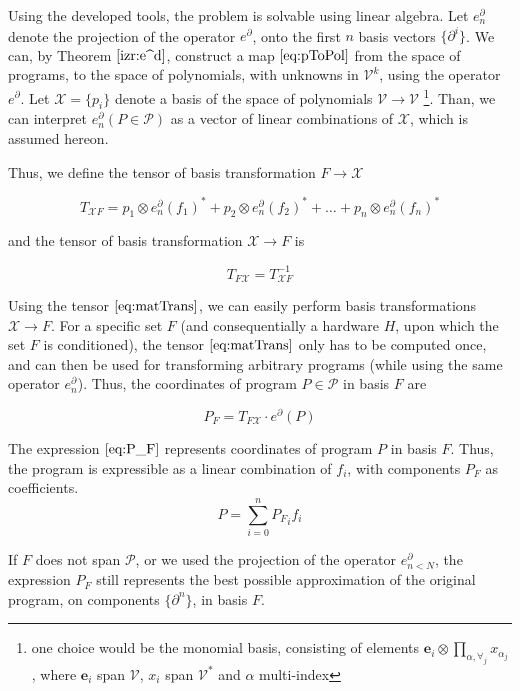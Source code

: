\documentclass[preprint,12pt]{elsarticle}
\newcommand{\VV}{\mathcal{V}}
\newcommand{\e}{\mathbf{e}}
\newcommand{\X}{\mathcal{X}}
\newcommand{\dP}{\mathcal{P}}
\newcommand{\D}{\partial}
\begin{document}
   Using the developed tools, the problem is solvable using linear algebra. Let
   $e^\D_n$ denote the projection of the operator $e^\D$, onto the first $n$
   basis vectors $\{\D^i\}$. We can, by Theorem $\ref{izr:e^d}$, construct a map
   $\eqref{eq:pToPol}$ from the space of programs, to the space of polynomials,
   with unknowns in $\VV^k$, using the operator $e^\D$. Let $\X=\{p_i\}$ denote a basis of
   the space of polynomials $\VV\to \VV$ \footnote{one choice would be the monomial basis,
   consisting of elements $\e_i\otimes\prod\limits_{\alpha,\forall_j}
   x_{\alpha_j}$, where $\e_i$ span $\VV$, $x_i$ span $\VV^*$ and $\alpha$
   multi-index}. Than, we can interpret $e^\D_n(P\in\dP)$ as a vector of linear combinations of $\X$, which is assumed hereon.
  
  Thus, we define the tensor of basis transformation $F\to\X$
  
  \begin{equation}\label{eq:matTransF}
  T_{\X F}=
  p_1\otimes e_n^\D(f_1)^* + p_2\otimes e_n^\D(f_2)^* + \ldots + p_n\otimes e_n^\D(f_n)^*
  \end{equation}
  
  and the tensor of basis transformation $\X\to F$ is
  
  \begin{equation}\label{eq:matTrans}
  T_{F\X}=T_{\X F}^{-1}
  \end{equation}
  
  Using the tensor $\eqref{eq:matTrans}$, we can easily perform basis transformations $\X\to F$. For a specific set $F$ (and consequentially a hardware $H$, upon which the set $F$ is conditioned), the tensor $\eqref{eq:matTrans}$ only has to be computed once, and can then be used for transforming arbitrary programs (while using the same operator $e^\D_n$).
  Thus, the coordinates of program $P\in\dP$ in basis $F$ are
  
  \begin{equation}\label{eq:P_F}
  	P_F=T_{F\X}\cdot e^\D(P)
  \end{equation}
  
  The expression $\eqref{eq:P_F}$ represents coordinates of program $P$ in basis $F$. Thus, the program is expressible as a linear combination of $f_i$, with components $P_F$ as coefficients.
  \begin{equation}
  P=\sum\limits_{i=0}^{n}{P_F}_if_i
  \end{equation}
  
  If $F$ does not span $\dP$, or we used the projection of the operator $e^\D_{n<N}$, the expression $P_F$ still represents the best possible approximation of the original program, on components $\{\D^n\}$, in basis $F$.
  
\end{document}
